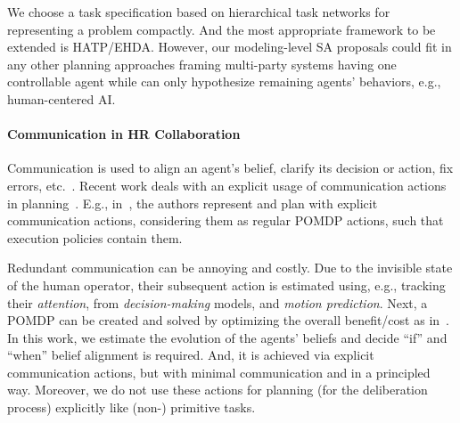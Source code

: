 \documentclass[letterpaper]{article} %
\begin{document}
We choose a task specification based on hierarchical task networks for representing a problem compactly. And the most appropriate framework to be extended is HATP/EHDA.
However, our modeling-level SA proposals could fit in any other planning approaches framing multi-party systems having one
controllable agent while can only hypothesize remaining agents' behaviors, e.g., human-centered AI.


\paragraph{Communication in HR Collaboration}
Communication 
is used to align an agent's belief, clarify its decision or action, fix errors, etc.~\cite{tellex2014asking,sebastiani2017dealing}. 
Recent work deals with an explicit usage of communication actions in planning~\cite{BuisanSA20,nikolaidis2018planning,roncone2017transparent,sanelli2017short,UnhelkarLS20}. 
E.g., in~\cite{roncone2017transparent,UnhelkarLS20}, the authors represent and plan with explicit communication actions, considering them as regular POMDP actions, such that execution policies contain them. 

Redundant communication can be annoying and costly. Due to the invisible state of the human operator, their subsequent action is estimated using, e.g., tracking their \textit{attention}, from   \textit{decision-making} models, and \textit{motion prediction}. 
Next, a POMDP can be created and solved by optimizing the overall benefit/cost as in~\cite{UnhelkarLS20}. 
In this work, 
we estimate the evolution of the agents' beliefs and decide ``if'' and ``when'' belief alignment is required. And, it is achieved via explicit communication actions, 
but with minimal communication and in a principled way. Moreover, we do not use these actions for planning (for the deliberation process) explicitly like (non-) primitive tasks.    
\end{document}
